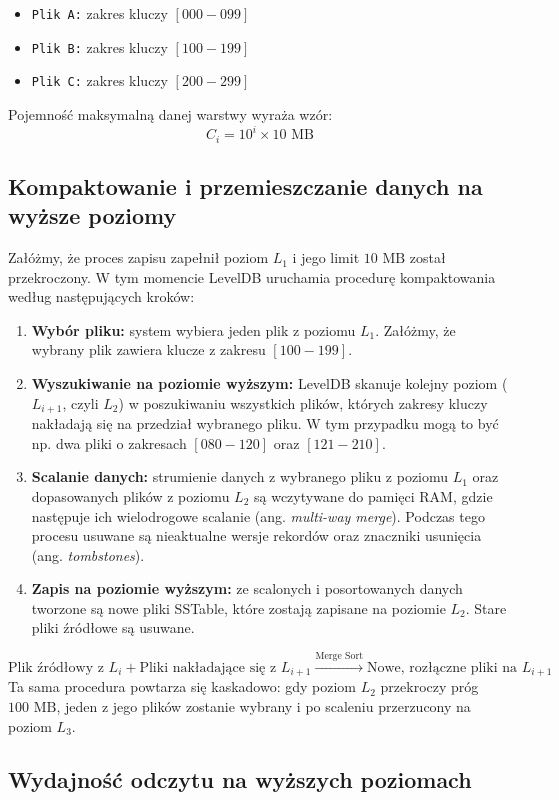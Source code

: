 \begin{itemize}
    \item \texttt{Plik A:} zakres kluczy $[000 - 099]$
    \item \texttt{Plik B:} zakres kluczy $[100 - 199]$
    \item \texttt{Plik C:} zakres kluczy $[200 - 299]$
\end{itemize}
Pojemność maksymalną danej warstwy wyraża wzór:
$$C_i = 10^i \times 10 \text{ MB}$$
\subsection{Kompaktowanie i przemieszczanie danych na wyższe poziomy}

Załóżmy, że proces zapisu zapełnił poziom $L_1$ i jego limit $10 \text{ MB}$ został przekroczony. W tym momencie LevelDB uruchamia procedurę kompaktowania według następujących kroków:

\begin{enumerate}
    \item \textbf{Wybór pliku:} system wybiera jeden plik z poziomu $L_1$. Załóżmy, że wybrany plik zawiera klucze z zakresu $[100-199]$.
    \item \textbf{Wyszukiwanie na poziomie wyższym:} LevelDB skanuje kolejny poziom ($L_{i+1}$, czyli $L_2$) w poszukiwaniu wszystkich plików, których zakresy kluczy nakładają się na przedział wybranego pliku. W tym przypadku mogą to być np. dwa pliki o zakresach $[080-120]$ oraz $[121-210]$.
    \item \textbf{Scalanie danych:} strumienie danych z wybranego pliku z poziomu $L_1$ oraz dopasowanych plików z poziomu $L_2$ są wczytywane do pamięci RAM, gdzie następuje ich wielodrogowe scalanie (ang. \emph{multi-way merge}). Podczas tego procesu usuwane są nieaktualne wersje rekordów oraz znaczniki usunięcia (ang. \emph{tombstones}).
    \item \textbf{Zapis na poziomie wyższym:} ze scalonych i posortowanych danych tworzone są nowe pliki SSTable, które zostają zapisane na poziomie $L_2$. Stare pliki źródłowe są usuwane.
\end{enumerate}
$$\text{Plik źródłowy z } L_i + \text{Pliki nakładające się z } L_{i+1} \xrightarrow{\text{Merge Sort}} \text{Nowe, rozłączne pliki na } L_{i+1}$$
Ta sama procedura powtarza się kaskadowo: gdy poziom $L_2$ przekroczy próg $100 \text{ MB}$, jeden z jego plików zostanie wybrany i po scaleniu przerzucony na poziom $L_3$.
\subsection{Wydajność odczytu na wyższych poziomach}

